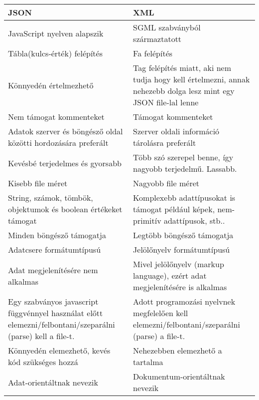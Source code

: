 \begin{center}
	

	\begin{tabular}{|p{7.2cm}|p{7.2cm}|}
		\hline
		\textbf{JSON} & \textbf{XML} \\
		\hline
		JavaScript nyelven alapszik & SGML szabványból származtatott \\
		\hline
		Tábla(kulcs-érték) felépítés & Fa felépítés \\
		\hline
		Könnyedén értelmezhető & Tag felépítés miatt, aki nem tudja hogy kell értelmezni, annak nehezebb dolga lesz mint egy JSON file-lal lenne\\
		\hline
		Nem támogat kommenteket & Támogat kommenteket \\
		\hline
		Adatok szerver és böngésző oldal közötti hordozására preferált & Szerver oldali információ tárolásra preferált\\
		\hline
		Kevésbé terjedelmes és gyorsabb & Több szó szerepel benne, így nagyobb terjedelmű. Lassabb.\\
		\hline
		Kisebb file méret & Nagyobb file méret\\
		\hline
		String, számok, tömbök, objektumok és boolean értékeket támogat & Komplexebb adattípusokat is támogat például képek, nem-primitív adattípusok, stb..\\
		\hline
		Minden böngésző támogatja & Legtöbb böngésző támogatja\\
		\hline
		Adatcsere formátumtípusú & Jelölőnyelv formátumtípusú\\
		\hline
		Adat megjelenítésére nem alkalmas & Mivel jelölőnyelv (markup language), ezért adat megjelenítésére is alkalmas\\
		\hline
		Egy szabványos javascript függvénnyel használat előtt elemezni/felbontani/szeparálni (parse) kell a file-t. & Adott programozási nyelvnek megfelelően kell elemezni/felbontani/szeparálni (parse) a file-t.\\
		\hline
		Könnyedén elemezhető, kevés kód szükséges hozzá & Nehezebben elemezhető a tartalma\\
		\hline
		Adat-orientáltnak nevezik & Dokumentum-orientáltnak nevezik\\
		\hline
	\end{tabular}
\end{center}


